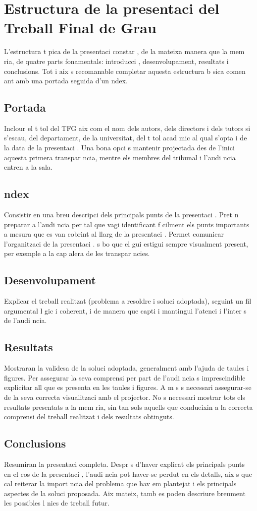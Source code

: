 \section{Estructura de la presentaci  del Treball Final de Grau}

L'estructura t pica de la presentaci  constar , de la mateixa manera que la mem ria, de quatre parts fonamentals: introducci , desenvolupament, resultats i conclusions. Tot i aix   s recomanable completar aquesta estructura b sica comen ant amb una portada seguida d'un  ndex.
\subsection{Portada} Inclour  el t tol del \ac{TFG} aix  com el nom dels autors, dels directors i dels tutors si s'escau, del departament, de la universitat, del t tol acad mic al qual s'opta i de la data de la presentaci . Una bona opci   s mantenir projectada des de l'inici aquesta primera transpar ncia, mentre els membres del tribunal i l'audi ncia entren a la sala.
\subsection{ ndex} Consistir  en una breu descripci  dels principals punts de la presentaci . Pret n preparar a l'audi ncia per tal que vagi identificant f cilment els punts importants a mesura que es van cobrint al llarg de la presentaci . Permet comunicar l'organitzaci  de la presentaci .  s bo que el gui  estigui sempre visualment present, per exemple a la cap alera de les transpar ncies.
\subsection{Desenvolupament} Explicar  el treball realitzat (problema a resoldre i soluci  adoptada), seguint un fil argumental l gic i coherent, i de manera que capti i mantingui l'atenci  i l'inter s de l'audi ncia.
\subsection{Resultats} Mostraran la validesa de la soluci  adoptada, generalment amb l'ajuda de taules i figures. Per assegurar la seva comprensi  per part de l'audi ncia  s imprescindible explicitar all  que es presenta en les taules i figures. A m s  s necessari assegurar-se de la seva correcta visualitzaci  amb el projector. No  s necessari mostrar tots els resultats presentats a la mem ria, sin  tan sols aquells que condueixin a la correcta comprensi  del treball realitzat i dels resultats obtinguts.
\subsection{Conclusions} Resumiran la presentaci  completa. Despr s d'haver explicat els principals punts en el cos de la presentaci , l'audi ncia pot haver-se perdut en els detalls, aix   s que cal reiterar la import ncia del problema que hav em plantejat i els principals aspectes de la soluci  proposada. Aix  mateix, tamb  es poden descriure breument les possibles l nies de treball futur.
